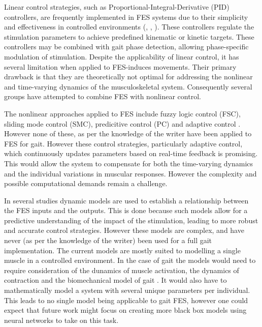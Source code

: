 Linear control strategies, such as Proportional-Integral-Derivative (PID) controllers, are frequently implemented in FES systems due to their simplicity and effectiveness in controlled environments (\cite{chaikho_transcutaneous_2022}, \cite{bouri_closed-loop_2018}, \cite{dodson_experimental_2017}). These controllers regulate the stimulation parameters to achieve predefined kinematic or kinetic targets. These controllers may be combined with gait phase detection, allowing phase-specific modulation of stimulation. Despite the applicability of linear control, it has several limitation when applied to FES-induces movements. Their primary drawback is that they are theoretically not optimal for addressing the nonlinear and time-varying dynamics of the musculoskeletal system. Consequently several groups have attempted to combine FES with nonlinear control.

The nonlinear approaches applied to FES include fuzzy logic control (FSC), sliding mode control (SMC), predicitive control (PC) and adaptive control \cite{chaikho_transcutaneous_2022} . However none of these, as per the knowledge of the writer have been applied to FES for gait. However these control strategies, particularly adaptive control, which continuously updates parameters based on real-time feedback is promising. This would allow the system to compensate for both the time-varying dynamics and the individual variations in muscular responses. However the complexity and possible computational demands remain a challenge. 

In several studies  dynamic models are used to establish a relationship between the FES inputs and the outputs. This is done because such models allow for a predictive understanding of the impact of the stimulation, leading to more robust and accurate control strategies. However these models are complex, and have never (as per the knowledge of the writer) been used for a full gait implementation. The current models  are mostly suited to modelling a single muscle in a controlled environment. In the case of gait the models would need to require consideration of the dunamics of muscle activation, the dynamics of contraction and the biomechanical model of gait \cite{chaikho_transcutaneous_2022}. It would also have to mathematically model a system with several unique parameters per individual. This leads to no single model being applicable to gait FES, however one could expect that future work might focus on creating more black box models using neural networks to take on this task.

